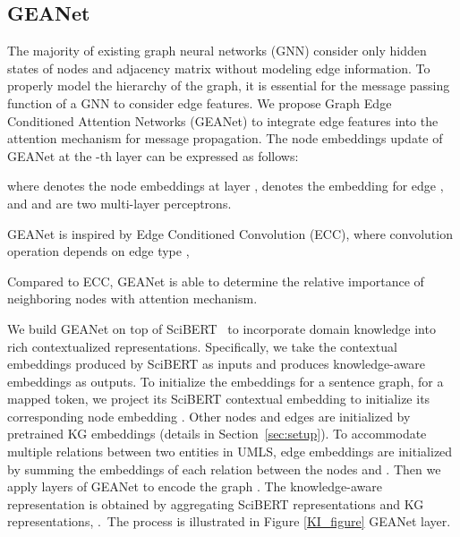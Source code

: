 \documentclass[11pt,a4paper]{article}
\makeatletter
\newcommand{\GAENet}{\textrm{GEANet}}
\renewcommand\paragraph{\@startsection{paragraph}{4}{\z@}{.25ex \@plus.5ex \@minus.2ex}{-1em}{\normalfont\normalsize\bfseries}}
\makeatother
\begin{document}
\subsection{\GAENet}
The majority of existing graph neural networks (GNN) consider only hidden states of nodes and adjacency matrix without modeling edge information. To properly model the hierarchy of the graph, it is essential for the message passing function of a GNN to consider edge features. We propose Graph Edge Conditioned Attention Networks (\GAENet) to integrate edge features into the attention mechanism for message propagation. The node embeddings update of \GAENet{} at the -th layer can be expressed as follows:

{\small
}

where  denotes the node embeddings at layer ,  denotes the embedding for edge , and  and  are two multi-layer perceptrons.

\GAENet{} is inspired by Edge Conditioned Convolution (ECC), where convolution operation depends on edge type \cite{simonovsky2017dynamic},

{\small

}
Compared to ECC, \GAENet{} is able to determine the relative importance of neighboring nodes with attention mechanism.



\paragraph{Knowledge Incorporation.}
\label{knowledge_incorporation}
We build \GAENet{} on top of SciBERT~\cite{peters-etal-2019-knowledge} 
to incorporate domain knowledge into rich contextualized representations. Specifically, we take the contextual embeddings  produced by SciBERT as inputs and produces knowledge-aware embeddings  as outputs. 
To initialize the embeddings for a sentence graph, for a mapped token, we project its SciBERT contextual embedding to initialize its corresponding node embedding . Other nodes and edges are initialized by pretrained KG embeddings (details in Section~\ref{sec:setup}). To accommodate multiple relations between two entities in UMLS, edge embeddings  are initialized by summing the embeddings of each relation between the nodes  and . Then we apply layers of \GAENet{} to encode the graph .  The knowledge-aware representation is obtained by aggregating SciBERT representations and KG representations, .\footnotemark ~The process is illustrated in Figure \ref{KI_figure} \GAENet{} layer.
\end{document}
